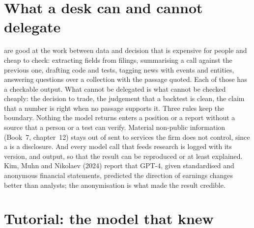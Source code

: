 \section{What a desk can and cannot delegate}

 are good at the work between data and decision that is expensive for people and cheap to check: extracting
fields from filings, summarising a call against the previous one, drafting code and tests, tagging news with events and
entities, answering questions over a collection with the passage quoted. Each of those has a checkable output. What cannot
be delegated is what cannot be checked cheaply: the decision to trade, the judgement that a backtest is clean, the claim that
a number is right when no passage supports it. Three rules keep the boundary. Nothing the model returns enters a
position or a report without a source that a person or a test can verify. Material non-public information (Book~7,
chapter~12) stays out of  sent to services the firm does not control, since a  is a disclosure. And every model
call that feeds research is logged with its version,  and output, so that the result can be reproduced or at least
explained. Kim, Muhn and Nikolaev (2024) report that GPT-4, given standardised and anonymous financial statements, predicted
the direction of earnings changes better than analysts; the anonymisation is what made the result credible.

\section{Tutorial: the model that knew}\label{tut:ml:large-language-models-in-finance:tut}

